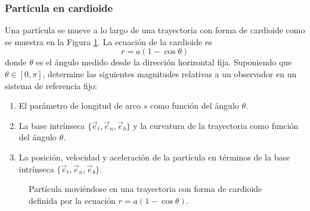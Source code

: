 \subsubsection{Partícula en cardioide}
Una partícula se mueve a lo largo de una trayectoria con forma de cardioide como se muestra en la Figura \ref{fig:cardioide}. La ecuación de la cardioide es
\[ r = a(1 - \cos \theta) \]
donde \( \theta \) es el ángulo medido desde la dirección horizontal fija. Suponiendo que \( \theta \in [0, \pi] \), determine las siguientes magnitudes relativas a un observador en un sistema de referencia fijo:

\begin{enumerate}
    \item El parámetro de longitud de arco \( s \) como función del ángulo \( \theta \).
    \item La base intrínseca \( \{ \vec{e}_t, \vec{e}_n, \vec{e}_b \} \) y la curvatura de la trayectoria como función del ángulo \( \theta \).
    \item La posición, velocidad y aceleración de la partícula en términos de la base intrínseca \( \{ \vec{e}_t, \vec{e}_n, \vec{e}_b \} \).
\end{enumerate}

\begin{figure}[!ht]
    \centering
    \caption{Partícula moviéndose en una trayectoria con forma de cardioide definida por la ecuación $r = a(1 - \cos \theta)$.}
    \label{fig:cardioide}
\end{figure}